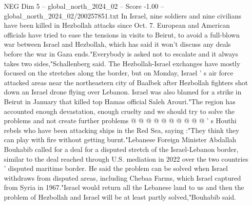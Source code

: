 \begin{textsample}{NEG Dim 5 – global\_north\_2024\_02 – Score -1.00 – global\_north\_2024\_02/200257851.txt}
In Israel, nine soldiers and nine civilians have been killed in Hezbollah attacks since Oct. 7.
European and American officials have tried to ease the tensions in visits to Beirut, to avoid a full-blown war between Israel and Hezbollah, which has said it won't discuss any deals before the war in Gaza ends."Everybody is asked not to escalate and it always takes two sides,"Schallenberg said.
The Hezbollah-Israel exchanges have mostly focused on the stretches along the border, but on Monday, Israel ' s air force attacked areas near the northeastern city of Baalbek after Hezbollah fighters shot down an Israel drone flying over Lebanon.
Israel was also blamed for a strike in Beirut in January that killed top Hamas official Saleh Arouri."The region has accounted enough devastation, enough cruelty and we should try to solve the problems and not create further problems @ @ @ @ @ @ @ @ @ @ ' s Houthi rebels who have been attacking ships in the Red Sea, saying :"They think they can play with fire without getting burnt."Lebanese Foreign Minister Abdallah Bouhabib called for a deal for a disputed stretch of the Israel-Lebanon border, similar to the deal reached through U.S. mediation in 2022 over the two countries ' disputed maritime border.
He said the problem can be solved when Israel withdraws from disputed areas, including Chebaa Farms, which Israel captured from Syria in 1967."Israel would return all the Lebanese land to us and then the problem of Hezbollah and Israel will be at least partly solved,"Bouhabib said.

\end{textsample}
